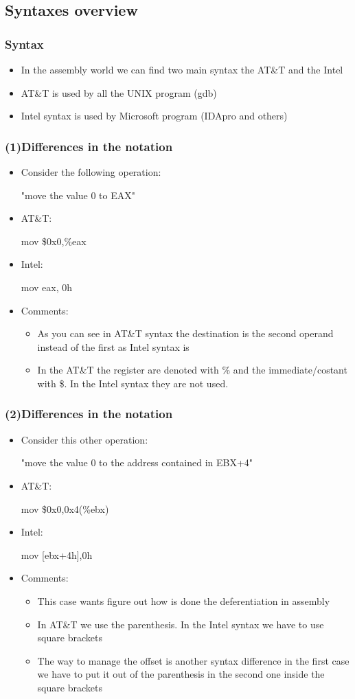 \documentclass[]{beamer}
\begin{document}
	\subsection{Syntaxes overview}
		\begin{frame}
			\frametitle{Syntax}
			\begin{itemize}
				\item{In the assembly world we can find two main syntax the AT\&T and the Intel}
				\item{AT\&T is used by all the UNIX program (gdb)}
				\item{Intel syntax is used by Microsoft program (IDApro and others)}
			\end{itemize}
		\end{frame}
		\begin{frame}
			\frametitle{(1)Differences in the notation}
			\begin{itemize}
				\item{Consider the following operation:\newline\centerline{"move the value 0 to EAX"}}
				\item{AT\&T: \centerline{ mov \$0x0,\%eax} }
				\item{Intel: \centerline{ mov eax, 0h}}
				\item{Comments:} 
				\begin{itemize}
					\item{As you can see in AT\&T syntax the destination is the second operand instead of the first as Intel syntax is}
					\item{In the AT\&T the register are denoted with \% and the immediate/costant with \$. In the Intel syntax they are not used. }
				\end{itemize}
			\end{itemize}
		\end{frame}
		\begin{frame}
			\frametitle{(2)Differences in the notation}
			\begin{itemize}
				\item{Consider this other operation:\newline\centerline {"move the value 0 to the address contained in EBX+4"}}
				\item{AT\&T: \centerline{ mov \$0x0,0x4(\%ebx)}}
				\item{Intel: \centerline{ mov [ebx+4h],0h }}
				\item{Comments:}
				\begin{itemize}
					\item{This case wants figure out how is done the deferentiation in assembly}
					\item{In AT\&T we use the parenthesis. In the Intel syntax we have to use square brackets}
					\item{The way to manage the offset is another syntax difference in the first case we have to put it out of the parenthesis in the second one inside the square brackets }
				\end{itemize}
			\end{itemize}
		\end{frame}
\end{document}
